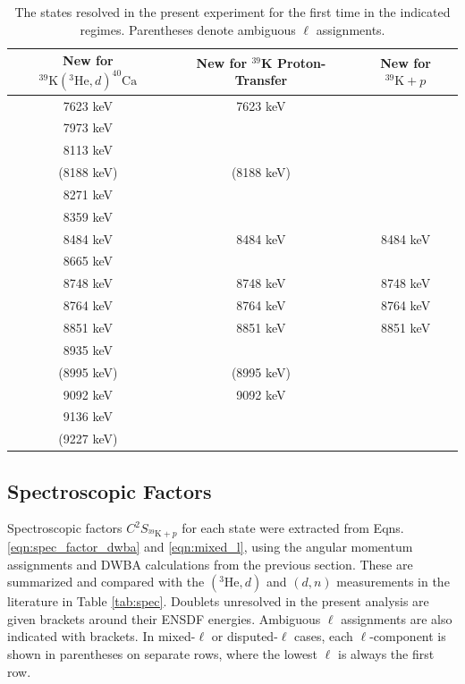 \begin{table}[t]
\centering
\caption{\label{tab:new_states}The states resolved in the present experiment for the first time in the indicated regimes. Parentheses denote ambiguous $\ell$ assignments.}
\begin{tabular}{ccc}
\hline\midrule
New for $^{39}\mathrm{K}(^{3}\mathrm{He},d)^{40}\mathrm{Ca}$&New for $^{39}$K Proton-Transfer&New for $^{39}\mathrm{K}+p$\\ \midrule
7623 keV&7623 keV&\\
7973 keV&&\\
8113 keV&&\\
(8188 keV)&(8188 keV)&\\
8271 keV&&\\
8359 keV&&\\
8484 keV&8484 keV&8484 keV\\
8665 keV&&\\
8748 keV&8748 keV&8748 keV\\
8764 keV&8764 keV&8764 keV\\
8851 keV&8851 keV&8851 keV\\
8935 keV&&\\
(8995 keV)&(8995 keV)&\\
9092 keV&9092 keV&\\
9136 keV&&\\
(9227 keV)&&\\
\hline\hline
\end{tabular}
\end{table}

\subsection{Spectroscopic Factors} \label{subsec:DWBA_Spec}

Spectroscopic factors $C^{2}S_{^{39}\mathrm{K} + p}$ for each state were extracted from Eqns. \ref{eqn:spec_factor_dwba} and \ref{eqn:mixed_l}, using the angular momentum assignments and DWBA calculations from the previous section. These are summarized and compared with the $(^{3}\mathrm{He},d)$ \cite{Erskine1966,Seth1967,Forster1970,Cage1971} and $(d,n)$ \cite{Fuchs1969} measurements in the literature in Table \ref{tab:spec}. Doublets unresolved in the present analysis are given brackets around their ENSDF \cite{Chen2017} energies. Ambiguous $\ell$ assignments are also indicated with brackets. In mixed-$\ell$ or disputed-$\ell$ cases, each $\ell$-component is shown in parentheses on separate rows, where the lowest $\ell$ is always the first row. 

